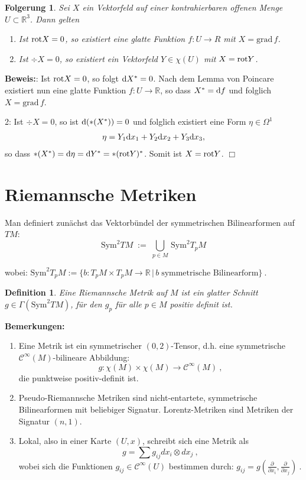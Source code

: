 \documentclass[12pt,a4paper]{article}
\def\R{\mathbb{R}}
\def\Sym{\mathrm{Sym}}
\def\grad{\mathrm{grad}\,}
\newtheorem{Folgerung}[Lemma]{Folgerung}
\newtheorem{Definition}[Lemma]{Definition}
\def\proof{\noindent\textbf{Beweis:}\quad}
\def\qed{\quad\hfill\ensuremath{\Box}}
\begin{document}
\bigskip

\begin{Folgerung}
Sei $X$ ein Vektorfeld auf einer kontrahierbaren offenen Menge $U\subset\R^3$.
Dann gelten
\begin{enumerate}
  \item Ist $\mathrm{rot} X = 0 $, so existiert eine glatte Funktion $f: U\to R$ mit
  $X= \grad f$.
  \item Ist $\div X = 0$, so existiert ein Vektorfeld $Y\in\chi(U)$ mit $X =
  \mathrm{rot} Y$.
\end{enumerate}
\end{Folgerung}

\proof
1: Ist $\mathrm{rot} X = 0$, so folgt $\mathrm{d} X^* = 0$. Nach dem Lemma von Poincare
existiert nun eine glatte Funktion $f: U\to \R$, so dass $X^*= \mathrm{d}f$ und folglich
$X = \grad f$.

\medskip

2: Ist $\div X = 0$, so ist $\mathrm{d}(*(X^*)) = 0$ und folglich existiert eine
Form $\eta\in\Omega^1$
\begin{align*}
\eta = Y_1\mathrm{d}x_1 + Y_2\mathrm{d}x_2 + Y_3\mathrm{d}x_3,
\end{align*} 
so dass $*(X^*) = \mathrm{d}\eta = \mathrm{d} Y^* = *(\mathrm{rot} Y)^*$. Somit ist $X= \mathrm{rot} Y$.
\qed 

\section{Riemannsche Metriken}


Man definiert zun\"achst das Vektorb\"undel der symmetrischen Bilinearformen auf $TM$:
$$
\Sym^2 TM \;:=\; \bigcup_{p\in M} \, \Sym^2 T_pM
$$

wobei: \quad
$
\Sym^2 T_pM := \{b : T_p M \times T_pM \rightarrow \R \,  | \,  b \; \mbox{symmetrische Bilinearform}\} \ .
$

\begin{Definition}
Eine \em{Riemannsche Metrik} auf $M$ ist ein glatter Schnitt $g\in \Gamma(\Sym^2 TM)$, f\"ur
den $g_p$ f\"ur alle $p\in M$ positiv definit ist.
\end{Definition}

{\bf Bemerkungen:}
\begin{enumerate}
 \item
Eine Metrik ist ein symmetrischer $(0,2)$-Tensor, d.h. eine symmetrische
$\mathcal C^\infty(M)$-bilineare Abbildung:
$$
g : \chi(M) \times \chi(M) \rightarrow \mathcal C^\infty(M) \ ,
$$
die punktweise positiv-definit ist.
 \item
Pseudo-Riemannsche Metriken sind nicht-entartete, symmetrische Bilinearformen mit beliebiger
Signatur. Lorentz-Metriken sind Metriken der  Signatur $(n,1)$.
 \item
Lokal, also in einer Karte $(U,x)$, schreibt sich eine Metrik als
$$
g = \sum g_{ij} dx_i \otimes dx_j \ ,
$$
wobei sich die Funktionen $g_{ij} \in \mathcal C^\infty(U)$ bestimmen durch:
$
g_{ij} = g \left(\frac{\partial}{\partial x_i}, \frac{\partial }{ \partial
x_j}\right) \ . $
\end{enumerate}
\end{document}
